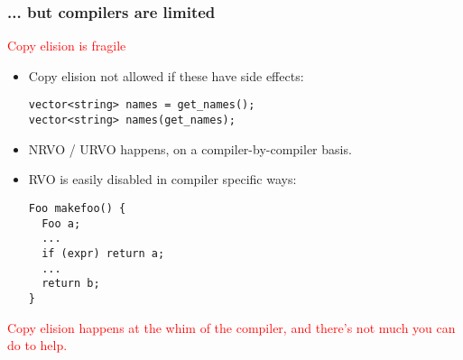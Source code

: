 \begin{frame}[fragile,t]
\frametitle{... but compilers are limited}

\textcolor{red}{Copy elision is fragile}


\begin{itemize}
\item<1-> Copy elision not allowed if these have side effects:
{\scriptsize
\begin{verbatim}
vector<string> names = get_names();
vector<string> names(get_names);
\end{verbatim}
}

\item<1-> NRVO / URVO happens, on a compiler-by-compiler basis.
\item<1-> RVO is easily disabled in compiler specific ways:
{\scriptsize
\begin{verbatim}
Foo makefoo() {
  Foo a;
  ...
  if (expr) return a;
  ...
  return b;
}
\end{verbatim}
}
\end{itemize}

\textcolor{red}{Copy elision happens at the whim of the compiler, and
  there's not much you can do to help.}
\end{frame}



